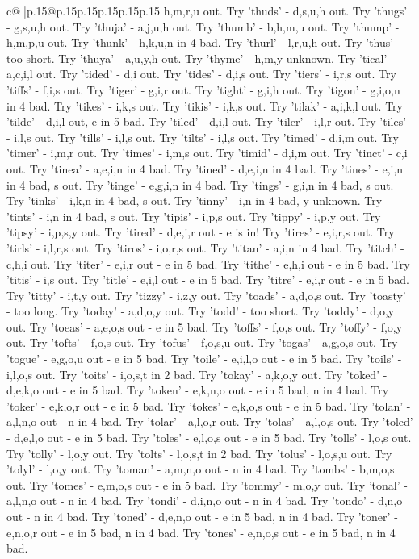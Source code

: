 \documentclass{article}
\begin{document}
{\begin{supertabular}{c@{$\;$}|p{.15\linewidth}@{}p{.15\linewidth}p{.15\linewidth}p{.15\linewidth}p{.15\linewidth}p{.15\linewidth}}
{{{h,m,r,u out. Try 'thuds' {-} d,s,u,h out. Try 'thugs' {-} g,s,u,h out. Try 'thuja' {-} a,j,u,h out. Try 'thumb' {-} b,h,m,u out. Try 'thump' {-} h,m,p,u out. Try 'thunk' {-} h,k,u,n in 4 bad. Try 'thurl' {-} l,r,u,h out. Try 'thus' {-} too short. Try 'thuya' {-} a,u,y,h out. Try 'thyme' {-} h,m,y unknown. Try 'tical' {-} a,c,i,l out. Try 'tided' {-} d,i out. Try 'tides' {-} d,i,s out. Try 'tiers' {-} i,r,s out. Try 'tiffs' {-} f,i,s out. Try 'tiger' {-} g,i,r out. Try 'tight' {-} g,i,h out. Try 'tigon' {-} g,i,o,n in 4 bad. Try 'tikes' {-} i,k,s out. Try 'tikis' {-} i,k,s out. Try 'tilak' {-} a,i,k,l out. Try 'tilde' {-} d,i,l out, e in 5 bad. Try 'tiled' {-} d,i,l out. Try 'tiler' {-} i,l,r out. Try 'tiles' {-} i,l,s out. Try 'tills' {-} i,l,s out. Try 'tilts' {-} i,l,s out. Try 'timed' {-} d,i,m out. Try 'timer' {-} i,m,r out. Try 'times' {-} i,m,s out. Try 'timid' {-} d,i,m out. Try 'tinct' {-} c,i out. Try 'tinea' {-} a,e,i,n in 4 bad. Try 'tined' {-} d,e,i,n in 4 bad. Try 'tines' {-} e,i,n in 4 bad, s out. Try 'tinge' {-} e,g,i,n in 4 bad. Try 'tings' {-} g,i,n in 4 bad, s out. Try 'tinks' {-} i,k,n in 4 bad, s out. Try 'tinny' {-} i,n in 4 bad, y unknown. Try 'tints' {-} i,n in 4 bad, s out. Try 'tipis' {-} i,p,s out. Try 'tippy' {-} i,p,y out. Try 'tipsy' {-} i,p,s,y out. Try 'tired' {-} d,e,i,r out {-} e is in! Try 'tires' {-} e,i,r,s out. Try 'tirls' {-} i,l,r,s out. Try 'tiros' {-} i,o,r,s out. Try 'titan' {-} a,i,n in 4 bad. Try 'titch' {-} c,h,i out. Try 'titer' {-} e,i,r out {-} e in 5 bad. Try 'tithe' {-} e,h,i out {-} e in 5 bad. Try 'titis' {-} i,s out. Try 'title' {-} e,i,l out {-} e in 5 bad. Try 'titre' {-} e,i,r out {-} e in 5 bad. Try 'titty' {-} i,t,y out. Try 'tizzy' {-} i,z,y out. Try 'toads' {-} a,d,o,s out. Try 'toasty' {-} too long. Try 'today' {-} a,d,o,y out. Try 'todd' {-} too short. Try 'toddy' {-} d,o,y out. Try 'toeas' {-} a,e,o,s out {-} e in 5 bad. Try 'toffs' {-} f,o,s out. Try 'toffy' {-} f,o,y out. Try 'tofts' {-} f,o,s out. Try 'tofus' {-} f,o,s,u out. Try 'togas' {-} a,g,o,s out. Try 'togue' {-} e,g,o,u out {-} e in 5 bad. Try 'toile' {-} e,i,l,o out {-} e in 5 bad. Try 'toils' {-} i,l,o,s out. Try 'toits' {-} i,o,s,t in 2 bad. Try 'tokay' {-} a,k,o,y out. Try 'toked' {-} d,e,k,o out {-} e in 5 bad. Try 'token' {-} e,k,n,o out {-} e in 5 bad, n in 4 bad. Try 'toker' {-} e,k,o,r out {-} e in 5 bad. Try 'tokes' {-} e,k,o,s out {-} e in 5 bad. Try 'tolan' {-} a,l,n,o out {-} n in 4 bad. Try 'tolar' {-} a,l,o,r out. Try 'tolas' {-} a,l,o,s out. Try 'toled' {-} d,e,l,o out {-} e in 5 bad. Try 'toles' {-} e,l,o,s out {-} e in 5 bad. Try 'tolls' {-} l,o,s out. Try 'tolly' {-} l,o,y out. Try 'tolts' {-} l,o,s,t in 2 bad. Try 'tolus' {-} l,o,s,u out. Try 'tolyl' {-} l,o,y out. Try 'toman' {-} a,m,n,o out {-} n in 4 bad. Try 'tombs' {-} b,m,o,s out. Try 'tomes' {-} e,m,o,s out {-} e in 5 bad. Try 'tommy' {-} m,o,y out. Try 'tonal' {-} a,l,n,o out {-} n in 4 bad. Try 'tondi' {-} d,i,n,o out {-} n in 4 bad. Try 'tondo' {-} d,n,o out {-} n in 4 bad. Try 'toned' {-} d,e,n,o out {-} e in 5 bad, n in 4 bad. Try 'toner' {-} e,n,o,r out {-} e in 5 bad, n in 4 bad. Try 'tones' {-} e,n,o,s out {-} e in 5 bad, n in 4 bad. }}}
\end{supertabular}}
\end{document}
